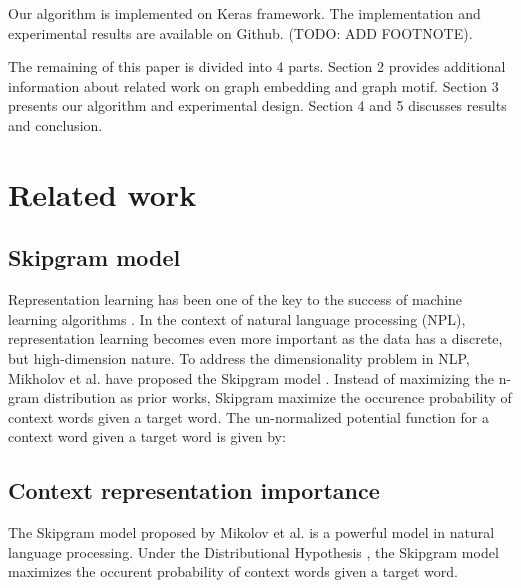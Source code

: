\documentclass[letterpaper]{article}
\begin{document}
        Our algorithm is implemented on Keras \cite{Keras} framework. The implementation and experimental
        results are available on Github. (TODO: ADD FOOTNOTE).

        The remaining of this paper is divided into 4 parts. Section 2 provides additional information
        about related work on graph embedding and graph motif. Section 3 presents our algorithm and
        experimental design. Section 4 and 5 discusses results and conclusion.

    \section{Related work}
        \subsection{Skipgram model}
            Representation learning has been one of the key to the success of machine learning 
            algorithms \cite{bengiorepreview}. In the context of natural language processing (NPL),
            representation learning becomes even more important as the data has a discrete, but
            high-dimension nature. To address the dimensionality problem in NLP, Mikholov et al. have
            proposed the Skipgram model \cite{Skipgram}. Instead of maximizing the n-gram distribution
            as prior works, Skipgram maximize the occurence probability of context words given a
            target word. The un-normalized potential function for a context word given a target 
            word is given by:


        \subsection{Context representation importance}
            The Skipgram model proposed by Mikolov et al. \cite{skipgram} is a powerful model 
            in natural language processing. Under the Distributional Hypothesis \cite{disthyp},
            the Skipgram model maximizes the occurent probability of context words given a target
            word. 
\end{document}
